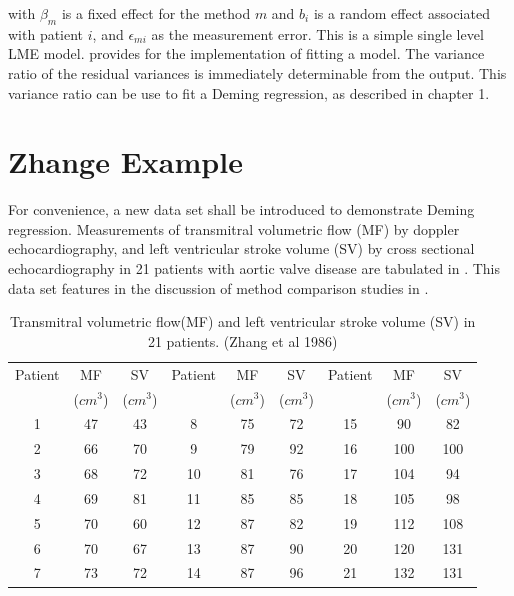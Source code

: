 \documentclass[12pt, a4paper]{report}
\theoremstyle{plain}
\theoremstyle{definition}
\theoremstyle{remark}
\begin{document}
with $\beta_{m}$ is a fixed effect for the method $m$ and $b_{i}$ is a random effect associated with patient $i$, and
$\epsilon_{mi}$ as the measurement error. This is a simple single level LME model. \citet{pb} provides for the implementation of fitting a model. The variance ratio of the residual variances is immediately determinable from the output. This variance ratio can be use to fit a Deming regression, as described in chapter 1.




\section{Zhange Example}
For convenience, a new data set shall be introduced to demonstrate Deming regression. Measurements of transmitral volumetric flow (MF) by doppler echocardiography, and left ventricular stroke volume (SV) by cross sectional echocardiography in 21 patients
with aortic valve disease are tabulated in \citet{zhang}. This data set features in the discussion of method comparison studies
in \citet[p.398]{AltmanBook} .



\begin{table}[h!]
	\begin{center}
		\begin{tabular}{|c|c|c||c|c|c||c|c|c|}
			\hline
			Patient & MF  & SV  & Patient & MF  & SV  & Patient & MF  & SV \\
			&($cm^{3}$)&  ($cm^{3}$) & &($cm^{3}$)&  ($cm^{3}$) & &($cm^{3}$)&  ($cm^{3}$)
			\\
			\hline
			1 & 47 & 43 &  8 & 75 & 72 &  15 & 90 & 82 \\
			2 & 66 & 70 & 9 & 79 & 92 &  16 & 100 & 100 \\
			3 & 68 & 72 & 10 & 81 & 76 & 17 & 104 & 94 \\
			4 & 69 & 81 & 11 & 85 & 85 &  18 & 105 & 98 \\
			5 & 70 & 60 & 12 & 87 & 82 & 19 & 112 & 108 \\
			6 & 70 & 67 & 13 & 87 & 90 & 20 & 120 & 131 \\
			7 & 73 & 72 & 14 & 87 & 96 &  21 & 132 & 131 \\
			
			\hline
		\end{tabular}
		\caption{Transmitral volumetric flow(MF) and left ventricular
			stroke volume (SV) in 21 patients. (Zhang et al 1986)}
	\end{center}
\end{table}
\end{document}
